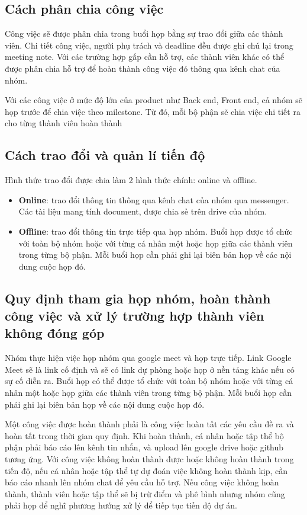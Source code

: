 \documentclass[12pt,a4paper]{article}
\begin{document}
\subsection{Cách phân chia công việc}
Công việc sẽ được phân chia trong buổi họp bằng sự trao đổi giữa các thành viên. Chi tiết công việc, người phụ trách và deadline đều được ghi chú lại trong meeting note. Với các trường hợp gấp cần hỗ trợ, các thành viên khác có thể được phân chia hỗ trợ để hoàn thành công việc đó thông qua kênh chat của nhóm. 

Với các công việc ở mức độ lớn của product như Back end, Front end, cả nhóm sẽ họp trước để chia việc theo milestone. Từ đó, mỗi bộ phận sẽ chia việc chi tiết ra cho từng thành viên hoàn thành



\subsection{Cách trao đổi và quản lí tiến độ}
Hình thức trao đổi được chia làm 2 hình thức chính: online và offline.
\begin{itemize}
    \item \textbf{Online}: trao đổi thông tin thông qua kênh chat của nhóm qua messenger. Các tài liệu mang tính document, được chia sẻ trên drive của nhóm.
    \item \textbf{Offline}: trao đổi thông tin trực tiếp qua họp nhóm. Buổi họp được tổ chức với toàn bộ nhóm hoặc với từng cá nhân một hoặc họp giữa các thành viên trong từng bộ phận. Mỗi buổi họp cần phải ghi lại biên bản họp về các nội dung cuộc họp đó.
\end{itemize}

\subsection{Quy định tham gia họp nhóm, hoàn thành công việc và xử lý trường hợp thành viên không đóng góp}

Nhóm thực hiện việc họp nhóm qua google meet và họp trực tiếp. Link Google Meet sẽ là link cố định và sẽ có link dự phòng hoặc họp ở nền tảng khác nếu có sự cố diễn ra. Buổi họp có thể được tổ chức với toàn bộ nhóm hoặc với từng cá nhân một hoặc họp giữa các thành viên trong từng bộ phận. Mỗi buổi họp cần phải ghi lại biên bản họp về các nội dung cuộc họp đó.

Một công việc được hoàn thành phải là công việc hoàn tất các yêu cầu đề ra và hoàn tất trong thời gian quy định. Khi hoàn thành, cá nhân hoặc tập thể bộ phận phải báo cáo lên kênh tin nhắn, và upload lên google drive hoặc github tương ứng. Với công việc không hoàn thành được hoặc không hoàn thành trong tiến độ, nếu cá nhân hoặc tập thể tự dự đoán việc không hoàn thành kịp, cần báo cáo nhanh lên nhóm chat để yêu cầu hỗ trợ. Nếu công việc không hoàn thành, thành viên hoặc tập thể sẽ bị trừ điểm và phê bình nhưng nhóm cũng phải họp để nghĩ phương hướng xử lý để tiếp tục tiến độ dự án. 
\end{document}
